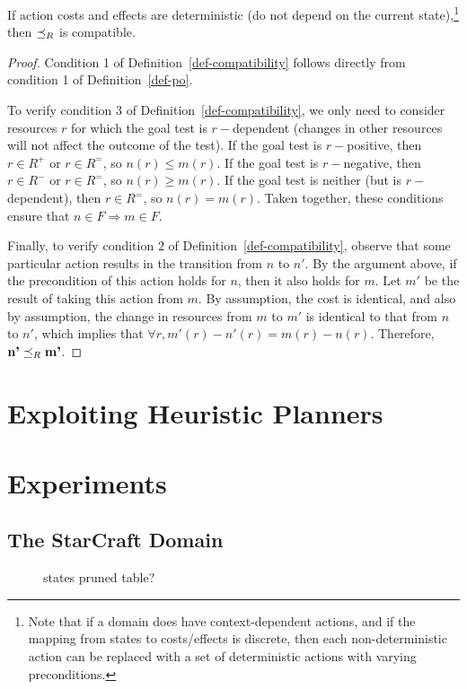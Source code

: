 \documentclass[letterpaper]{article}
\theoremstyle{plain} \newtheorem{theorem}{Theorem} \newtheorem{proposition}{Proposition} \newtheorem{lemma}{Lemma}
\theoremstyle{definition} \newtheorem{definition}{Definition} \newtheorem{conjecture}{Conjecture} \newtheorem*{example}{Example}
\theoremstyle{remark} \newtheorem*{remark}{Remark} \newtheorem*{note}{Note} \newtheorem{case}{Case}
\begin{document}
\begin{claim}{}{\label{clm-po-compatible}}
	If action costs and effects are deterministic (do not depend on the current state),\footnote{Note that if a domain does have context-dependent actions, and if the mapping from states to costs/effects is discrete, then each non-deterministic action can be replaced with a set of deterministic actions with varying preconditions.} then $\preceq_R$ is compatible.
\end{claim}
\begin{proof}
	Condition 1 of Definition~\ref{def-compatibility} follows directly from condition 1 of Definition~\ref{def-po}.
	
	To verify condition 3 of Definition~\ref{def-compatibility}, we only need to consider resources $r$ for which the goal test is $r-$dependent (changes in other resources will not affect the outcome of the test). If the goal test is $r-$positive, then $r \in R^+$ or $r \in R^=$, so $n(r) \le m(r)$. If the goal test is $r-$negative, then $r \in R^-$ or $r \in R^=$, so $n(r) \ge m(r)$. If the goal test is neither (but is $r-$dependent), then $r \in R^=$, so $n(r) = m(r)$. Taken together, these conditions ensure that $n \in F \Rightarrow m \in F$.
	
	Finally, to verify condition 2 of Definition~\ref{def-compatibility}, observe that some particular action results in the transition from $n$ to $n'$. By the argument above, if the precondition of this action holds for $n$, then it also holds for $m$. Let $m'$ be the result of taking this action from $m$. By assumption, the cost is identical, and also by assumption, the change in resources from $m$ to $m'$ is identical to that from $n$ to $n'$, which implies that $\forall r, m'(r) - n'(r) = m(r) - n(r)$. Therefore, $\textbf{n'} \preceq_R \textbf{m'}$.
\end{proof}

\section{Exploiting Heuristic Planners}

\section{Experiments}

\subsection{The StarCraft Domain}
\begin{figure}
  \caption{states pruned table?}
\end{figure}
\end{document}
